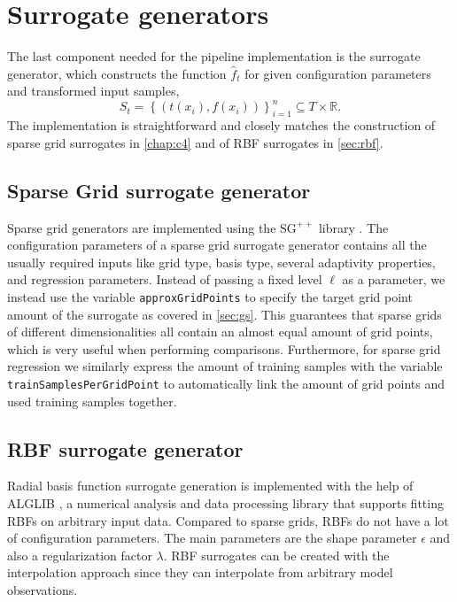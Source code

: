 \documentclass[
  a4paper,  %
  twoside,  %
  bibliography=totoc,
  headsepline,
  cleardoublepage=empty,
  parskip=half,
  draft=false
]{scrbook}
\begin{document}
\section {Surrogate generators}
\label{sec:sg}

The last component needed for the pipeline implementation is the surrogate generator, which constructs the function $\hat{f}_t$ for given configuration parameters and transformed input samples,
\begin{equation}
S_t=\left\{\left(t(x_i), f(x_i)\right)\right\}_{i=1}^n \subseteq T \times \mathds{R}.
\end{equation}
The implementation is straightforward and closely matches the construction of sparse grid surrogates in \cref{chap:c4} and of RBF surrogates in \cref{sec:rbf}.

\subsection {Sparse Grid surrogate generator}

Sparse grid generators are implemented using the $\mathrm{SG}^{++}$ library \cite{Pflueger2010}.
The configuration parameters of a sparse grid surrogate generator contains all the usually required inputs like grid type, basis type, several adaptivity properties, and regression parameters.
Instead of passing a fixed level $\ell$ as a parameter, we instead use the variable \texttt{approxGridPoints} to specify the target grid point amount of the surrogate as covered in \cref{sec:gs}.
This guarantees that sparse grids of different dimensionalities all contain an almost equal amount of grid points, which is very useful when performing comparisons.
Furthermore, for sparse grid regression we similarly express the amount of training samples with the variable \texttt{trainSamplesPerGridPoint} to automatically link the amount of grid points and used training samples together.

\subsection {RBF surrogate generator}

Radial basis function surrogate generation is implemented with the help of ALGLIB \cite{Bochkanov}, a numerical analysis and data processing library that supports fitting RBFs on arbitrary input data.
Compared to sparse grids, RBFs do not have a lot of configuration parameters.
The main parameters are the shape parameter $\epsilon$ and also a regularization factor $\lambda$.
RBF surrogates can be created with the interpolation approach since they can interpolate from arbitrary model observations.
\end{document}
